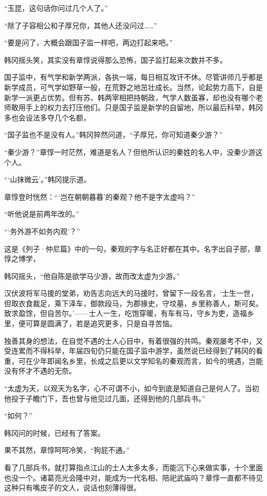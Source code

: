 “玉昆，这句话你问过几个人了。”

“除了子容相公和子厚兄你，其他人还没问过……”

“要是问了，大概会跟国子监一样吧，两边打起来吧。”

韩冈摇头笑，其实没有章惇说得那么恐怖，国子监打起来次数并不多。

国子监中，有气学和新学两派，各执一端，每日相互攻讦不休。尽管讲师几乎都是新学成员，可气学如野草一般，在荒野之地茁壮成长。当然，论起势力高下，自是新学一派更占优势。但有苏、韩两宰相把持朝政，气学人数虽寡，却也没有哪个老师敢用手上的权力去打压他们。只是国子监是新学的自留地，所以最后科举，韩冈多也会设法多夺几个名额，

“国子监也不是没有人。”韩冈猝然问道，“子厚兄，你可知道秦少游？”

“秦少游？”章惇一时茫然，难道是名人？但他所认识的秦姓的名人中，没秦少游这个人。

“‘山抹微云’。”韩冈提示道。

章惇登时恍然：“‘岂在朝朝暮暮’的秦观？他不是字太虚吗？”

“听他说是前两年改的。”

“‘务外游不如务内观’？”

这是《列子·仲尼篇》中的一句，秦观的字与名正好都在其中。名字出自子部，章惇之博学，

韩冈摇头，“他自陈是欲学马少游，故而改太虚为少游。”

汉伏波将军马援的堂弟，劝告志向远大的马援时，曾留下一段名言，‘士生一世，但取衣食裁足，乘下泽车，御款段马，为郡掾史，守坟墓，乡里称善人，斯可矣。致求盈馀，但自苦尔。’——士人一生，吃饱穿暖，有车有马，守乡为吏，造福乡里，便可算是圆满了，若是追究更多，只是自寻苦恼。

独善其身的想法，在自觉不遇的士人心目中，有着很强的共鸣。秦观屡考不中，又受连累而不得科举，年届四旬仍只能在国子监中游学，虽然说已经得到了韩冈的看重，可在少年即闻名乡里，长成之后更以文学知名的秦观而言，如今的境遇，岂能没有怀才不遇的无奈。

“太虚为天，以观天为名字，心不可谓不小，如今到底是知道自己是何人了。当初他投于子瞻门下，吾也曾与他见过几面，还得到他的几部兵书。”

“如何？”

韩冈问的时候，已经有了答案。

果不其然，章惇呵呵冷笑，“狗屁不通。”

看了几部兵书，就打算指点江山的士人太多太多，而能沉下心来做实事，十个里面也没一个。诸葛亮光会隆中对，能成为一代名相、陪祀武庙吗？章惇一直都不待见这种只有嘴皮子的文人，说话也刻薄得很。

